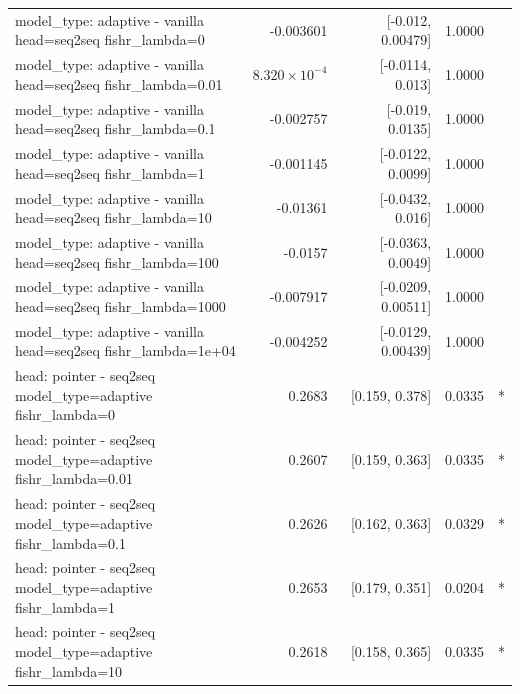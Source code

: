 \documentclass[10pt]{article}
\makeatletter
\newcommand{\stackcell}[1]{\begin{tabular}[t]{@{}l@{}}#1\end{tabular}}
\makeatother
\begin{document}
{\begin{longtable}{lrrrl}
\stackcell{model\_type: adaptive - vanilla\\\footnotesize head=seq2seq fishr\_lambda=0 } & -0.003601 & [-0.012, 0.00479] & 1.0000 & \\
\stackcell{model\_type: adaptive - vanilla\\\footnotesize head=seq2seq fishr\_lambda=0.01 } & $8.320\times10^{-4}$ & [-0.0114, 0.013] & 1.0000 & \\
\stackcell{model\_type: adaptive - vanilla\\\footnotesize head=seq2seq fishr\_lambda=0.1 } & -0.002757 & [-0.019, 0.0135] & 1.0000 & \\
\stackcell{model\_type: adaptive - vanilla\\\footnotesize head=seq2seq fishr\_lambda=1 } & -0.001145 & [-0.0122, 0.0099] & 1.0000 & \\
\stackcell{model\_type: adaptive - vanilla\\\footnotesize head=seq2seq fishr\_lambda=10 } & -0.01361 & [-0.0432, 0.016] & 1.0000 & \\
\stackcell{model\_type: adaptive - vanilla\\\footnotesize head=seq2seq fishr\_lambda=100 } & -0.0157 & [-0.0363, 0.0049] & 1.0000 & \\
\stackcell{model\_type: adaptive - vanilla\\\footnotesize head=seq2seq fishr\_lambda=1000 } & -0.007917 & [-0.0209, 0.00511] & 1.0000 & \\
\stackcell{model\_type: adaptive - vanilla\\\footnotesize head=seq2seq fishr\_lambda=1e+04 } & -0.004252 & [-0.0129, 0.00439] & 1.0000 & \\
\stackcell{head: pointer - seq2seq\\\footnotesize model\_type=adaptive fishr\_lambda=0 } & 0.2683 & [0.159, 0.378] & 0.0335 & *\\
\stackcell{head: pointer - seq2seq\\\footnotesize model\_type=adaptive fishr\_lambda=0.01 } & 0.2607 & [0.159, 0.363] & 0.0335 & *\\
\stackcell{head: pointer - seq2seq\\\footnotesize model\_type=adaptive fishr\_lambda=0.1 } & 0.2626 & [0.162, 0.363] & 0.0329 & *\\
\stackcell{head: pointer - seq2seq\\\footnotesize model\_type=adaptive fishr\_lambda=1 } & 0.2653 & [0.179, 0.351] & 0.0204 & *\\
\stackcell{head: pointer - seq2seq\\\footnotesize model\_type=adaptive fishr\_lambda=10 } & 0.2618 & [0.158, 0.365] & 0.0335 & *\\

\end{longtable}}
\end{document}
